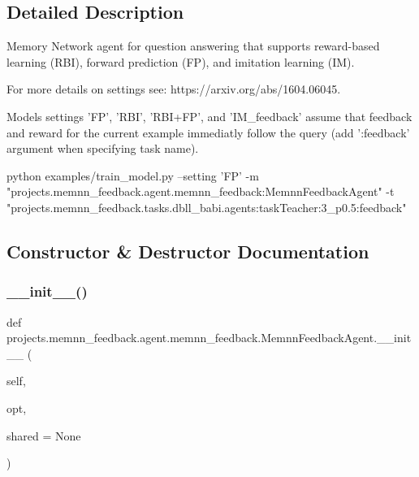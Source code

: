 \subsection{Detailed Description}
\begin{DoxyVerb}Memory Network agent for question answering that supports reward-based learning
(RBI), forward prediction (FP), and imitation learning (IM).

For more details on settings see: https://arxiv.org/abs/1604.06045.

Models settings 'FP', 'RBI', 'RBI+FP', and 'IM_feedback' assume that
feedback and reward for the current example immediatly follow the query
(add ':feedback' argument when specifying task name).

python examples/train_model.py --setting 'FP'
-m "projects.memnn_feedback.agent.memnn_feedback:MemnnFeedbackAgent"
-t "projects.memnn_feedback.tasks.dbll_babi.agents:taskTeacher:3_p0.5:feedback"
\end{DoxyVerb}
 

\subsection{Constructor \& Destructor Documentation}
\mbox{\label{classprojects_1_1memnn__feedback_1_1agent_1_1memnn__feedback_1_1MemnnFeedbackAgent_a08f6869824b3663c1cb76206daa07942}} 
\subsubsection{\texorpdfstring{\+\_\+\+\_\+init\+\_\+\+\_\+()}{\_\_init\_\_()}}
{\footnotesize\ttfamily def projects.\+memnn\+\_\+feedback.\+agent.\+memnn\+\_\+feedback.\+Memnn\+Feedback\+Agent.\+\_\+\+\_\+init\+\_\+\+\_\+ (\begin{DoxyParamCaption}\item[{}]{self,  }\item[{}]{opt,  }\item[{}]{shared = {\ttfamily None} }\end{DoxyParamCaption})}



